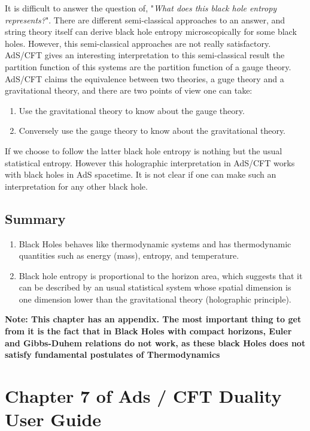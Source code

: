 \documentclass[12pt]{article}
\begin{document}
It is difficult to answer the question of, "\textit{What does this black hole entropy represents?}". There are different semi-classical approaches to an answer, and string theory itself can derive black hole entropy microscopically for some black holes. However, this semi-classical approaches are not really satisfactory. AdS/CFT gives an interesting interpretation to this semi-classical result the partition function of this systems are the partition function of a gauge theory. AdS/CFT claims the equivalence between two theories, a guge theory and a gravitational theory, and there are two points of view one can take:
\begin{enumerate}
    \item Use the gravitational theory to know about the gauge theory.
    \item Conversely use the gauge theory to know about the gravitational theory.
\end{enumerate}

If we choose to follow the latter black hole entropy is nothing but the usual statistical entropy. However this holographic interpretation in AdS/CFT works with black holes in AdS spacetime. It is not clear if one can make such an interpretation for any other black hole.


\subsection{Summary}
\begin{enumerate}
    \item Black Holes behaves like thermodynamic systems and has thermodynamic quantities such as energy (mass), entropy, and temperature.
    \item Black hole entropy is proportional to the horizon area, which suggests that it can be described by an usual statistical system whose spatial dimension is one dimension lower than the gravitational theory (holographic principle).
\end{enumerate}

\textbf{Note: This chapter has an appendix. The most important thing to get from it is the fact that in Black Holes with compact horizons, Euler and Gibbs-Duhem relations do not work, as these black Holes does not satisfy fundamental postulates of Thermodynamics}

\section{Chapter 7 of Ads / CFT Duality User Guide}
\end{document}
